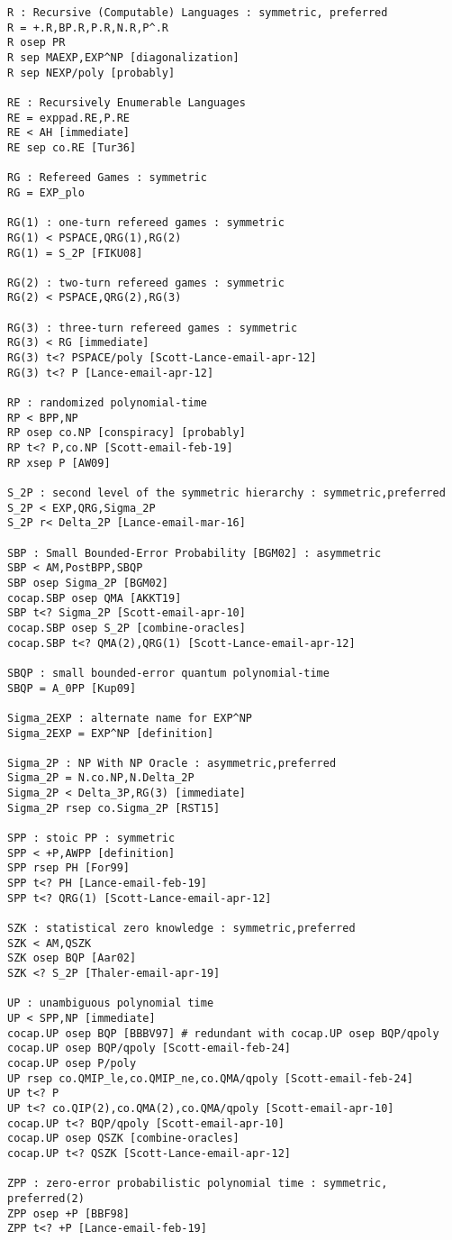 \begin{verbatim}
R : Recursive (Computable) Languages : symmetric, preferred
R = +.R,BP.R,P.R,N.R,P^.R
R osep PR
R sep MAEXP,EXP^NP [diagonalization]
R sep NEXP/poly [probably]

RE : Recursively Enumerable Languages
RE = exppad.RE,P.RE
RE < AH [immediate]
RE sep co.RE [Tur36]

RG : Refereed Games : symmetric
RG = EXP_plo

RG(1) : one-turn refereed games : symmetric
RG(1) < PSPACE,QRG(1),RG(2)
RG(1) = S_2P [FIKU08]

RG(2) : two-turn refereed games : symmetric
RG(2) < PSPACE,QRG(2),RG(3)

RG(3) : three-turn refereed games : symmetric
RG(3) < RG [immediate]
RG(3) t<? PSPACE/poly [Scott-Lance-email-apr-12]
RG(3) t<? P [Lance-email-apr-12]

RP : randomized polynomial-time
RP < BPP,NP
RP osep co.NP [conspiracy] [probably]
RP t<? P,co.NP [Scott-email-feb-19]
RP xsep P [AW09]

S_2P : second level of the symmetric hierarchy : symmetric,preferred
S_2P < EXP,QRG,Sigma_2P
S_2P r< Delta_2P [Lance-email-mar-16]

SBP : Small Bounded-Error Probability [BGM02] : asymmetric
SBP < AM,PostBPP,SBQP
SBP osep Sigma_2P [BGM02]
cocap.SBP osep QMA [AKKT19]
SBP t<? Sigma_2P [Scott-email-apr-10]
cocap.SBP osep S_2P [combine-oracles]
cocap.SBP t<? QMA(2),QRG(1) [Scott-Lance-email-apr-12]

SBQP : small bounded-error quantum polynomial-time
SBQP = A_0PP [Kup09]

Sigma_2EXP : alternate name for EXP^NP
Sigma_2EXP = EXP^NP [definition]

Sigma_2P : NP With NP Oracle : asymmetric,preferred
Sigma_2P = N.co.NP,N.Delta_2P
Sigma_2P < Delta_3P,RG(3) [immediate]
Sigma_2P rsep co.Sigma_2P [RST15]

SPP : stoic PP : symmetric
SPP < +P,AWPP [definition]
SPP rsep PH [For99]
SPP t<? PH [Lance-email-feb-19]
SPP t<? QRG(1) [Scott-Lance-email-apr-12]

SZK : statistical zero knowledge : symmetric,preferred
SZK < AM,QSZK
SZK osep BQP [Aar02]
SZK <? S_2P [Thaler-email-apr-19]

UP : unambiguous polynomial time
UP < SPP,NP [immediate]
cocap.UP osep BQP [BBBV97] # redundant with cocap.UP osep BQP/qpoly
cocap.UP osep BQP/qpoly [Scott-email-feb-24]
cocap.UP osep P/poly 
UP rsep co.QMIP_le,co.QMIP_ne,co.QMA/qpoly [Scott-email-feb-24]
UP t<? P
UP t<? co.QIP(2),co.QMA(2),co.QMA/qpoly [Scott-email-apr-10]
cocap.UP t<? BQP/qpoly [Scott-email-apr-10]
cocap.UP osep QSZK [combine-oracles]
cocap.UP t<? QSZK [Scott-Lance-email-apr-12]

ZPP : zero-error probabilistic polynomial time : symmetric, preferred(2)
ZPP osep +P [BBF98]
ZPP t<? +P [Lance-email-feb-19]
\end{verbatim}